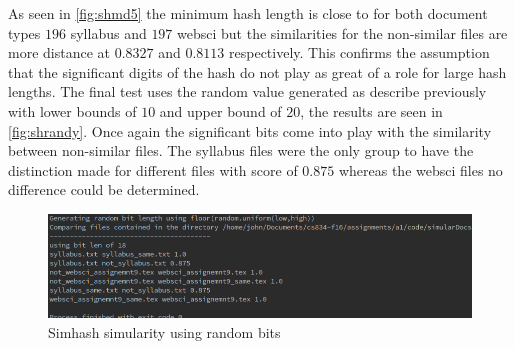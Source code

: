 \documentclass[11pt]{article}
\newenvironment{code}{\captionsetup{type=listing}}{}
\begin{document}
As seen in \autoref{fig:shmd5} the minimum hash length is close to for both document types $196$ syllabus and $197$ websci but the similarities for the non-similar files are more distance at $0.8327$ and $0.8113$ respectively. This confirms the assumption that the significant digits of the hash do not play as great of a role for large hash lengths.\newpage
\noindent
The final test uses the random value generated as describe previously with lower bounds of $10$ and upper bound of $20$, the results are seen in \autoref{fig:shrandy}. Once again the significant bits come into play with the similarity between non-similar files. The syllabus files were the only group to have the distinction made for different files with score of $0.875$ whereas the websci files no difference could be determined.
\begin{figure}[h]
\centering
	\includegraphics[scale=0.6]{randBits.png}
	\caption{Simhash simularity using random bits} \label{fig:shrandy}
\end{figure}\newline
\begin{code}
	\label{code:simhash}
\end{code}
\newpage
\clearpage

\end{document}
